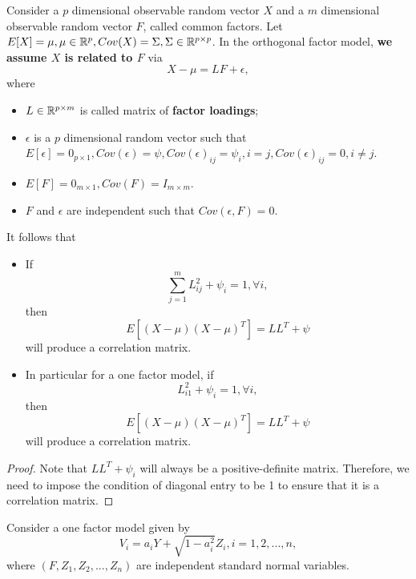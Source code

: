 \begin{refsection}
\begin{lemma}\label{ch:statistical-models:th:ConditionForCorrelationStructureFactorModel}
Consider a $p$ dimensional observable random vector $X$ and a $m$ dimensional observable random vector $F$, called common factors. Let $E[X] = \mu, \mu\in \mathbb{R}^p, Cov(X) = \Sigma,\Sigma\in\mathbb{R}^{p\times p}$. 
In the orthogonal factor model, \textbf{we assume $X$ is related to $F$} via
$$X - \mu = L F + \epsilon,$$
where 
\begin{itemize}
	\item $L\in \mathbb{R}^{p\times m}$ is called matrix of \textbf{factor loadings};
	\item $\epsilon$ is a $p$ dimensional random vector such that $E[\epsilon] = 0_{p\times 1}, Cov(\epsilon) = \psi, Cov(\epsilon)_{ij} = \psi_{i}, i = j, Cov(\epsilon)_{ij} = 0, i\neq j$.
	\item $E[F] = 0_{m\times 1}, Cov(F) = I_{m\times m}.$
	\item $F$ and $\epsilon$ are independent such that $Cov(\epsilon, F) = 0$.
\end{itemize}

It follows that
\begin{itemize}
	\item If 
	$$\sum_{j=1}^m L_{ij}^2 + \psi_i = 1, \forall i,$$
	then $$E[(X-\mu)(X-\mu)^T] = LL^T + \psi$$ will produce a correlation matrix.
	\item In particular for a one factor model, if
	$$ L_{i1}^2 + \psi_i = 1, \forall i,$$
	then $$E[(X-\mu)(X-\mu)^T] = LL^T + \psi$$ will produce a correlation matrix.
\end{itemize}	
\end{lemma}
\begin{proof}
Note that
	$LL^T + \psi_i$ will always be a positive-definite matrix. Therefore, we need to impose the condition of diagonal entry to be 1 to ensure that it is a correlation matrix.
\end{proof}


\begin{example}
	Consider a one factor model given by
$$V_i = a_i Y + \sqrt{1-a_i^2}Z_i, i=1,2,...,n,$$
where $(F,Z_1,Z_2,...,Z_n)$ are independent standard normal variables. 


\end{example}
\end{refsection}
